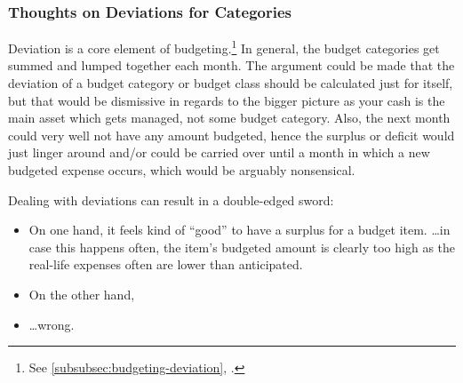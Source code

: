 \subsubsection{Thoughts on Deviations for Categories}
\label{subsubsec:thoughts-deviations-for-categories}

Deviation is a core element of budgeting.\footnote{See \autoref{subsubsec:budgeting-deviation}, .}
In general, the budget categories get summed and lumped together each month.
The argument could be made that the deviation of a budget category or budget class should be calculated just for itself, but that would be dismissive in regards to the bigger picture as your cash is the main asset which gets managed, not some budget category.
Also, the next month could very well not have any amount budgeted, hence the surplus or deficit would just linger around and/or could be carried over until a month in which a new budgeted expense occurs, which would be arguably nonsensical.

Dealing with deviations can result in a double-edged sword:
\begin{itemize}
	\item On one hand, it feels kind of ``good'' to have a surplus for a budget item.
	\ldots in case this happens often, the item's budgeted amount is clearly too high as the real-life expenses often are lower than anticipated.
	\item On the other hand, 
	\item \ldots wrong.
\end{itemize}